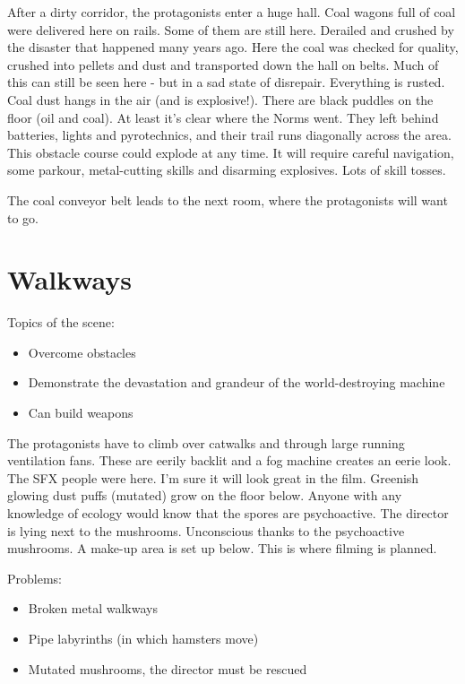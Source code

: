 After a dirty corridor, the protagonists enter a huge hall. Coal wagons full of coal were delivered here on rails. Some of them are still here. Derailed and crushed by the disaster that happened many years ago. Here the coal was checked for quality, crushed into pellets and dust and transported down the hall on belts. Much of this can still be seen here - but in a sad state of disrepair.
Everything is rusted. Coal dust hangs in the air (and is explosive!). There are black puddles on the floor (oil and coal).
At least it's clear where the Norms went. They left behind batteries, lights and pyrotechnics, and their trail runs diagonally across the area. This obstacle course could explode at any time. It will require careful navigation, some parkour, metal-cutting skills and disarming explosives. Lots of skill tosses.

The coal conveyor belt leads to the next room, where the protagonists will want to go.


\section{Walkways}

Topics of the scene:
\begin{itemize}
\item Overcome obstacles
\item Demonstrate the devastation and grandeur of the world-destroying machine
\item Can build weapons
\end{itemize}

The protagonists have to climb over catwalks and through large running ventilation fans.
These are eerily backlit and a fog machine creates an eerie look. The SFX people were here. I'm sure it will look great in the film.
Greenish glowing dust puffs (mutated) grow on the floor below. Anyone with any knowledge of ecology would know that the spores are psychoactive. The director is lying next to the mushrooms. Unconscious thanks to the psychoactive mushrooms.
A make-up area is set up below. This is where filming is planned.

Problems:
\begin{itemize}
\item Broken metal walkways
\item Pipe labyrinths (in which hamsters move)
\item Mutated mushrooms, the director must be rescued
\end{itemize}


